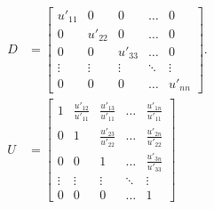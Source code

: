 \documentclass{article}
\begin{document}
\begin{align*}
  D &= \begin{bmatrix}
    u'_{11} & 0  & 0  &  \dots &  0 \\
    0 & u'_{22}  & 0   &   \dots &  0 \\
    0 & 0   & u'_{33}  &   \dots &  0 \\
    \vdots &  \vdots  & \vdots  & \ddots & \vdots \\
    0 & 0  &   0   & \dots &  u'_{nn}
  \end{bmatrix}.
                       \\
  U  &=  \begin{bmatrix}
    1 & \frac{u'_{12}}{u'_{11}} & \frac{u'_{13}}{u'_{11}} &   \dots &  \frac{u'_{1n}}{u'_{11}} \\
    0 & 1  &   \frac{u'_{23}}{u'_{22}} &   \dots &  \frac{u'_{2n}}{u'_{22}} \\
    0 & 0  &   1 & \dots &  \frac{u'_{3n}}{u'_{33}} \\
    \vdots &  \vdots  & \vdots  & \ddots & \vdots \\
    0 & 0  &   0 &  \dots &  1
  \end{bmatrix}
\end{align*}
\end{document}
